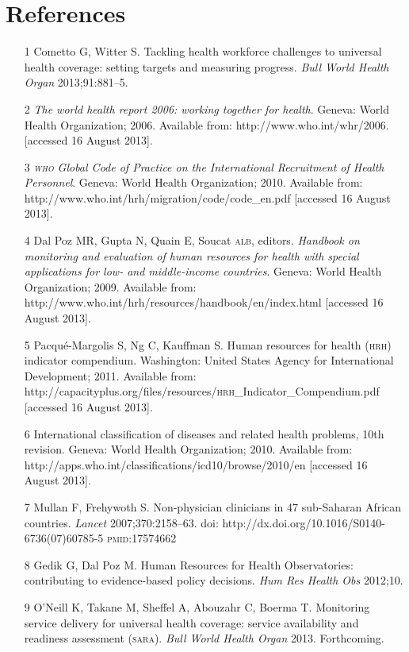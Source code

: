 \documentclass{article}
\begin{document}
\section*{References}
\begin{itemize}

\item[1] Cometto G, Witter S. Tackling health workforce challenges to
universal health coverage: setting targets and measuring progress. \textit{Bull
World Health Organ}
2013;91:881–5.

\item[2] \textit{The world health report 2006: working together for
health}. Geneva: World Health Organization; 2006. Available from:
http://www.who.int/whr/2006. [accessed 16 August 2013].

\item[3] \textit{\textsc{who} Global Code of Practice on the International Recruitment
of Health Personnel}. Geneva: World Health Organization; 2010.
Available from: http://www.who.int/hrh/migration/code/code\_{}en.pdf [accessed
16
August 2013].

\item[4] Dal Poz MR, Gupta N, Quain E, Soucat \textsc{alb}, editors. \textit{Handbook
on monitoring and evaluation of human resources for health with special
applications for low- and middle-income countries}. Geneva: World
Health Organization; 2009. Available from:
http://www.who.int/hrh/resources/handbook/en/index.html [accessed 16 August
2013].

\item[5] Pacqué-Margolis S, Ng C, Kauffman S. Human resources for health
(\textsc{hrh}) indicator compendium. Washington: United States Agency for International
Development; 2011. Available from:
http://capacityplus.org/files/resources/\textsc{hrh}\_{}Indicator\_{}Compendium.pdf
[accessed
16 August 2013].

\item[6] International classification of diseases and related health
problems, 10th revision. Geneva: World Health Organization; 2010. Available
from: http://apps.who.int/classifications/icd10/browse/2010/en [accessed 16
August 2013].

\item[7] Mullan F, Frehywoth S. Non-physician clinicians in 47 sub-Saharan
African countries. \textit{Lancet}
2007;370:2158–63. doi:
http://dx.doi.org/10.1016/S0140-6736(07)60785-5 \textsc{pmid}:17574662

\item[8] Gedik G, Dal Poz M. Human Resources for Health Observatories:
contributing to evidence-based policy decisions. \textit{Hum Res Health
Obs}
2012;10.

\item[9] O’Neill K, Takane M, Sheffel A, Abouzahr C, Boerma T. Monitoring
service delivery for universal health coverage: service availability and
readiness assessment (\textsc{sara}). \textit{Bull World Health Organ}
2013.
Forthcoming.

\end{itemize}
\end{document}
